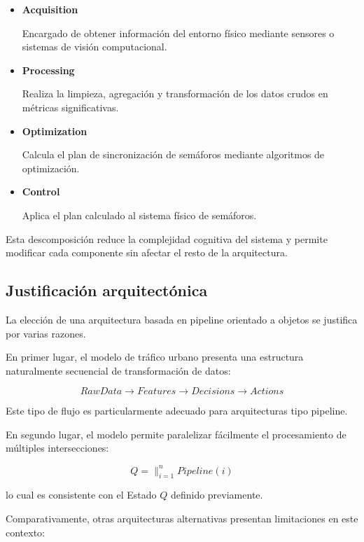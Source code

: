 \documentclass[12pt]{article}
\begin{document}
\begin{itemize}

\item \textbf{Acquisition}

Encargado de obtener información del entorno físico mediante sensores o sistemas de visión computacional.

\item \textbf{Processing}

Realiza la limpieza, agregación y transformación de los datos crudos en métricas significativas.

\item \textbf{Optimization}

Calcula el plan de sincronización de semáforos mediante algoritmos de optimización.

\item \textbf{Control}

Aplica el plan calculado al sistema físico de semáforos.

\end{itemize}

Esta descomposición reduce la complejidad cognitiva del sistema y permite modificar cada componente sin afectar el resto de la arquitectura.

\subsection{Justificación arquitectónica}

La elección de una arquitectura basada en pipeline orientado a objetos se justifica por varias razones.

En primer lugar, el modelo de tráfico urbano presenta una estructura naturalmente secuencial de transformación de datos:

\[
RawData \rightarrow Features \rightarrow Decisions \rightarrow Actions
\]

Este tipo de flujo es particularmente adecuado para arquitecturas tipo pipeline.

En segundo lugar, el modelo permite paralelizar fácilmente el procesamiento de múltiples intersecciones:

\[
Q = \parallel_{i=1}^{n} Pipeline(i)
\]

lo cual es consistente con el Estado \(Q\) definido previamente.

Comparativamente, otras arquitecturas alternativas presentan limitaciones en este contexto:
\end{document}
